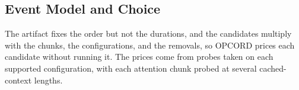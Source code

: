 \subsection{Event Model and Choice}
\label{subsec:pricing}
\label{subsec:split}
\label{subsec:formulation}

The artifact fixes the order but not the durations, and the candidates multiply with the chunks, the configurations, and the removals, so OPCORD prices each candidate without running it.
The prices come from probes taken on each supported configuration, with each attention chunk probed at several cached-context lengths.

